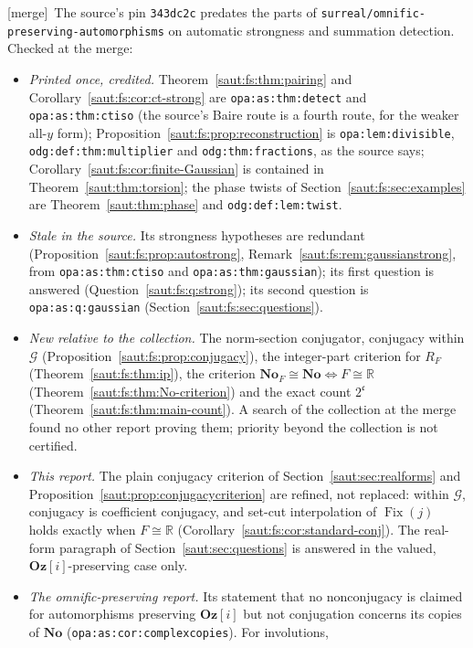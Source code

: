 \documentclass[11pt]{article}
\theoremstyle{definition}
\theoremstyle{remark}
\newcommand{\No}{\mathbf{No}}
\newcommand{\R}{\mathbb R}
\newcommand{\Fix}{\operatorname{Fix}}
\newcommand{\repo}[1]{\nolinkurl{#1}}%
\newcommand{\lbl}[1]{\nolinkurl{#1}}%
\newcommand{\Oz}{\mathbf{Oz}}
\newcommand{\cc}{\mathfrak c}
\newcommand{\mergetag}{\textup{[merge]}}
\numberwithin{equation}{section}
\begin{document}
\mergetag\ The source's pin \texttt{343dc2c} predates the parts of
\repo{surreal/omnific-preserving-automorphisms} on automatic strongness and summation
detection. Checked at the merge:
\begin{itemize}
\item \emph{Printed once, credited.} Theorem~\ref{saut:fs:thm:pairing} and
Corollary~\ref{saut:fs:cor:ct-strong} are \lbl{opa:as:thm:detect} and
\lbl{opa:as:thm:ctiso} (the source's Baire route is a fourth route, for the weaker
all-$y$ form); Proposition~\ref{saut:fs:prop:reconstruction} is \lbl{opa:lem:divisible},
\lbl{odg:def:thm:multiplier} and \lbl{odg:thm:fractions}, as the source says;
Corollary~\ref{saut:fs:cor:finite-Gaussian} is contained in
Theorem~\ref{saut:thm:torsion}; the phase twists of
Section~\ref{saut:fs:sec:examples} are Theorem~\ref{saut:thm:phase} and
\lbl{odg:def:lem:twist}.
\item \emph{Stale in the source.} Its strongness hypotheses are redundant
(Proposition~\ref{saut:fs:prop:autostrong}, Remark~\ref{saut:fs:rem:gaussianstrong},
from \lbl{opa:as:thm:ctiso} and \lbl{opa:as:thm:gaussian}); its first question is
answered (Question~\ref{saut:fs:q:strong}); its second question is
\lbl{opa:as:q:gaussian} (Section~\ref{saut:fs:sec:questions}).
\item \emph{New relative to the collection.} The norm-section conjugator, conjugacy
within $\mathcal G$ (Proposition~\ref{saut:fs:prop:conjugacy}), the integer-part
criterion for $R_F$ (Theorem~\ref{saut:fs:thm:ip}), the criterion
$\No_F\cong\No\iff F\cong\R$ (Theorem~\ref{saut:fs:thm:No-criterion}) and the exact
count $2^{\cc}$ (Theorem~\ref{saut:fs:thm:main-count}). A search of the collection at
the merge found no other report proving them; priority beyond the collection is not
certified.
\item \emph{This report.} The plain conjugacy criterion of
Section~\ref{saut:sec:realforms} and Proposition~\ref{saut:prop:conjugacycriterion}
are refined, not replaced: within $\mathcal G$, conjugacy is coefficient conjugacy, and
set-cut interpolation of $\Fix(j)$ holds exactly when $F\cong\R$
(Corollary~\ref{saut:fs:cor:standard-conj}). The real-form paragraph of
Section~\ref{saut:sec:questions} is answered in the valued, $\Oz[i]$-preserving case
only.
\item \emph{The omnific-preserving report.} Its statement that no nonconjugacy is
claimed for automorphisms preserving $\Oz[i]$ but not conjugation concerns its copies
of $\No$ (\lbl{opa:as:cor:complexcopies}). For involutions,

\end{itemize}
\end{document}
